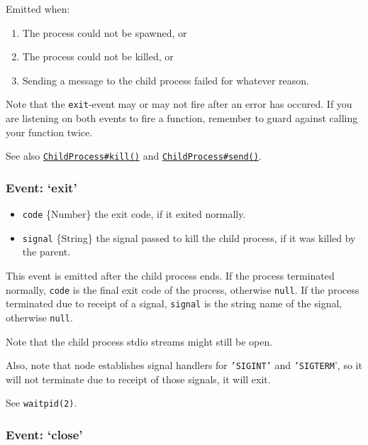 Emitted when:

\begin{enumerate}
\def\labelenumi{\arabic{enumi}.}
\itemsep1pt\parskip0pt
\item
  The process could not be spawned, or
\item
  The process could not be killed, or
\item
  Sending a message to the child process failed for whatever reason.
\end{enumerate}

Note that the \texttt{exit}-event may or may not fire after an error has
occured. If you are listening on both events to fire a function,
remember to guard against calling your function twice.

See also
\hyperref[childux5fprocessux5fchildux5fkillux5fsignal]{\texttt{ChildProcess\#kill()}}
and
\hyperref[childux5fprocessux5fchildux5fsendux5fmessageux5fsendhandle]{\texttt{ChildProcess\#send()}}.

\subsubsection{Event: `exit'}\label{event-exit}

\begin{itemize}
\itemsep1pt\parskip0pt
\item
  \texttt{code} \{Number\} the exit code, if it exited normally.
\item
  \texttt{signal} \{String\} the signal passed to kill the child
  process, if it was killed by the parent.
\end{itemize}

This event is emitted after the child process ends. If the process
terminated normally, \texttt{code} is the final exit code of the
process, otherwise \texttt{null}. If the process terminated due to
receipt of a signal, \texttt{signal} is the string name of the signal,
otherwise \texttt{null}.

Note that the child process stdio streams might still be open.

Also, note that node establishes signal handlers for \texttt{'SIGINT'}
and \texttt{'SIGTERM}', so it will not terminate due to receipt of those
signals, it will exit.

See \texttt{waitpid(2)}.

\subsubsection{Event: `close'}\label{event-close}

